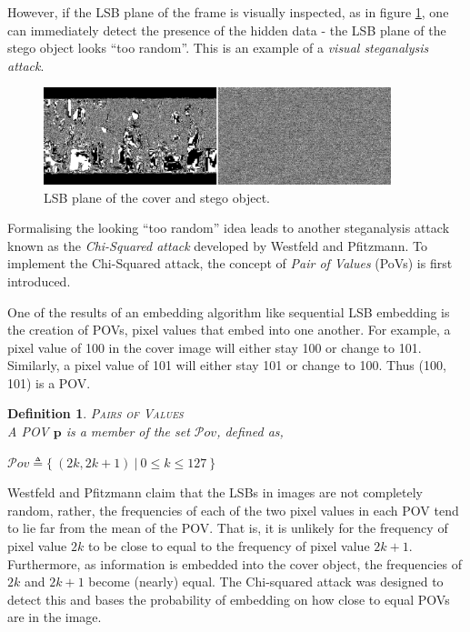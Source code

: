 \documentclass[paper=a4, fontsize=11pt,twoside]{scrartcl}    %
\numberwithin{table}{section}
\numberwithin{figure}{section}
\numberwithin{algorithm}{section}
\newtheorem{ddef}{Definition}[section]
\begin{document}
However, if the LSB plane of the frame is visually inspected, as in figure \ref{lsbemb}, one can immediately detect the presence of the hidden data - the LSB plane of the stego object looks ``too random''. This is an example of a \textit{visual steganalysis attack}.

\begin{figure}
\centerline{\includegraphics[width=0.9\textwidth]{images/lsb_emb.png}}
\caption{LSB plane of the cover and stego object.}
\label{lsbemb}
\end{figure}

Formalising the looking ``too random'' idea leads to another steganalysis attack known as the \textit{Chi-Squared attack} developed by Westfeld and Pfitzmann. To implement the Chi-Squared attack, the concept of \textit{Pair of Values} (PoVs) is first introduced.

One of the results of an embedding algorithm like sequential LSB embedding is the creation of POVs, pixel values that embed into one another. For example, a pixel value of 100 in the cover image will either stay 100 or change to 101. Similarly, a pixel value of 101 will either stay 101 or change to 100. Thus (100, 101) is a POV. 

\begin{ddef}
\textsc{Pairs of Values}\\[5pt]
A POV $\textbf{p}$ is a member of the set $\mathcal{P}ov$, defined as,
\begin{center}
$\mathcal{P}ov \triangleq \{~(2k, 2k + 1) ~\vert ~ 0 \leq k \leq 127 ~\}$
\end{center}
\end{ddef}

\noindent
Westfeld and Pfitzmann claim that the LSBs in images are not completely random, rather, the frequencies of each of the two pixel values in each POV tend to lie far from the mean of the POV. That is, it is unlikely for the frequency of pixel value $2k$ to be close to equal to the frequency of pixel value $2k+1$. Furthermore, as information is embedded into the cover object, the frequencies of $2k$ and $2k+1$ become (nearly) equal. The Chi-squared attack was designed to detect this and bases the probability of embedding on how close to equal POVs are in the image.
\end{document}
